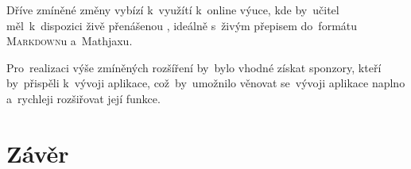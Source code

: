 \documentclass[14pt,a4paper]{article}
\begin{document}
        Dříve zmíněné změny vybízí k~využítí k~online výuce, kde by~učitel měl~k~dispozici živě přenášenou , ideálně s~živým přepisem do~formátu \textsc{Markdown}u a~Mathjaxu.

        Pro~realizaci výše zmíněných rozšíření by~bylo vhodné získat sponzory, kteří by~přispěli k~vývoji aplikace, což~by~umožnilo věnovat se~vývoji aplikace naplno a~rychleji rozšiřovat její funkce.
	
	\section{Závěr}

    \newpage
    \printbibliography
\end{document}
